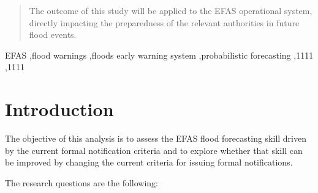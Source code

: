 \documentclass[preprint,12pt]{elsarticle}
\begin{document}
\begin{frontmatter}
\begin{abstract}
The outcome of this study will be applied to the EFAS operational system, directly impacting the preparedness of the relevant authorities in future flood events.

\end{abstract}



\begin{keyword}
EFAS \sep flood warnings \sep floods early warning system \sep probabilistic forecasting
 \sep 1111
 \sep 1111
\end{keyword}

\end{frontmatter}


\section{Introduction}
\label{sec:introduction}

The objective of this analysis is to assess the EFAS flood forecasting skill driven by the current formal notification criteria and to explore whether that skill can be improved by changing the current criteria for issuing formal notifications.

The research questions are the following:
\end{document}
